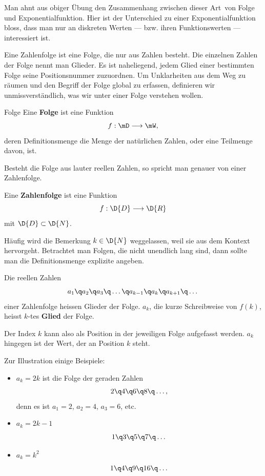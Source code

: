 \documentclass[%
11pt,%
twoside,%
titlepage,%
german,%
headsepline%
]{scrartcl}
\begin{document}
\begin{bem}
Man ahnt aus obiger Übung den Zusammenhang zwischen dieser \glqq Art\grqq\ von Folge und Exponentialfunktion. Hier ist der Unterschied zu einer Exponentialfunktion bloss, dass man nur an diskreten Werten --- bzw. ihren Funktionswerten --- interessiert ist.
\end{bem}
Eine Zahlenfolge ist eine Folge, die nur aus Zahlen besteht. Die einzelnen Zahlen der Folge nennt man Glieder. Es ist naheliegend, jedem Glied einer bestimmten Folge seine Positionsnummer zuzuordnen.
Um Unklarheiten aus dem Weg zu r\"aumen und den Begriff der Folge global zu erfassen, definieren wir unmissverst\"andlich, was wir unter einer Folge verstehen wollen.
\begin{cdef}[Folge]{Folge}
Eine \textbf{Folge} ist eine Funktion
$$f:\mD\longrightarrow\mW,$$
deren Definitionsmenge die Menge der nat\"urlichen Zahlen, oder eine Teilmenge davon, ist.
\end{cdef}
Besteht die Folge aus lauter reellen Zahlen, so spricht man genauer von einer Zahlenfolge.
\begin{cdef}[Zahlenfolge]{}
Eine \textbf{Zahlenfolge} ist eine Funktion
$$f:\D{D}\longrightarrow\D{R}$$
mit $\D{D}\subset\D{N}$.
\end{cdef}
\begin{bem}
H\"aufig wird die Bemerkung $k\in\D{N}$ weggelassen, weil sie aus dem Kontext hervorgeht. Betrachtet man Folgen, die nicht unendlich lang sind, dann sollte man die Defi\-ni\-tions\-menge explizite angeben.
\end{bem}
\begin{cdef}{}
Die reellen Zahlen
$$a_1\q a_2\q a_3\q\dots\q a_{k-1}\q a_k\q a_{k+1}\q\dots$$
einer Zahlenfolge heissen Glieder der Folge. $a_k$, die kurze Schreibweise von $f(k)$, heisst $k$-tes \textbf{Glied} der Folge.
\end{cdef}
\begin{bem}
Der Index $k$ kann also als Position in der jeweiligen Folge aufgefasst werden. $a_k$ hingegen ist der Wert, der an Position $k$ steht.
\end{bem}
\begin{bsps}
Zur Illustration einige Beispiele:
\begin{itemize}
\item $a_k=2k$ ist die Folge der geraden Zahlen
$$2\q4\q6\q8\q\dots,$$
denn es ist $a_1=2$, $a_2=4$, $a_3=6$, etc.
\item $a_k=2k-1$
$$1\q3\q5\q7\q\dots$$
\item $a_k=k^2$
$$1\q4\q9\q16\q\dots$$
\end{itemize}
\end{bsps}
\end{document}
